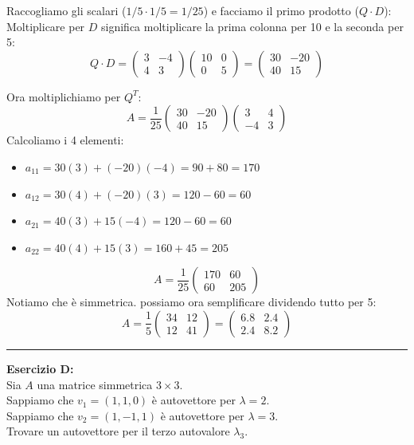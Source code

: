 \documentclass[10pt,a4paper]{article}
\begin{document}
Raccogliamo gli scalari ($1/5 \cdot 1/5 = 1/25$) e facciamo il primo prodotto ($Q \cdot D$):
Moltiplicare per $D$ significa moltiplicare la prima colonna per 10 e la seconda per 5:
\[ Q \cdot D = \begin{pmatrix} 3 & -4 \\ 4 & 3 \end{pmatrix} \begin{pmatrix} 10 & 0 \\ 0 & 5 \end{pmatrix} = \begin{pmatrix} 30 & -20 \\ 40 & 15 \end{pmatrix} \]

Ora moltiplichiamo per $Q^T$:
\[ A = \frac{1}{25} \begin{pmatrix} 30 & -20 \\ 40 & 15 \end{pmatrix} \begin{pmatrix} 3 & 4 \\ -4 & 3 \end{pmatrix} \]
Calcoliamo i 4 elementi:
\begin{itemize}
    \item $a_{11} = 30(3) + (-20)(-4) = 90 + 80 = 170$
    \item $a_{12} = 30(4) + (-20)(3) = 120 - 60 = 60$
    \item $a_{21} = 40(3) + 15(-4) = 120 - 60 = 60$ 
    \item $a_{22} = 40(4) + 15(3) = 160 + 45 = 205$
\end{itemize}

\[ A = \frac{1}{25} \begin{pmatrix} 170 & 60 \\ 60 & 205 \end{pmatrix} \]
Notiamo che è simmetrica. possiamo ora semplificare dividendo tutto per 5:
\[ A = \frac{1}{5} \begin{pmatrix} 34 & 12 \\ 12 & 41 \end{pmatrix} = \begin{pmatrix} 6.8 & 2.4 \\ 2.4 & 8.2 \end{pmatrix} \]

\vspace{0.4cm}
\hrule
\vspace{0.4cm}

\textbf{Esercizio D:}
\\ Sia $A$ una matrice simmetrica $3 \times 3$.
\\ Sappiamo che $v_1 = (1, 1, 0)$ è autovettore per $\lambda=2$.
\\ Sappiamo che $v_2 = (1, -1, 1)$ è autovettore per $\lambda=3$.
\\ Trovare un autovettore per il terzo autovalore $\lambda_3$.
\end{document}
